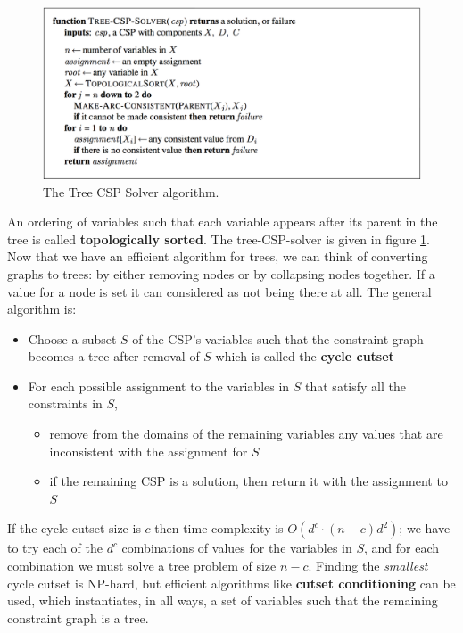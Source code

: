 \documentclass[twoside]{article}
\begin{document}
\begin{figure}
  \includegraphics[width=\linewidth]{tcs.png}
  \caption{The Tree CSP Solver algorithm.}
  \label{fig:tcs}
\end{figure}
An ordering of variables such that each variable appears after its parent in
the tree is called \textbf{topologically sorted}. The tree-CSP-solver is given
in figure \ref{fig:tcs}. Now that we have an efficient algorithm for trees, we 
can think of converting graphs to trees: by either removing nodes or by 
collapsing nodes together. If a value for a node is set it can considered as 
not being there at all. The general algorithm is:
\begin{itemize}
        \item Choose a subset \(S\) of the CSP's variables such that the 
        constraint graph becomes a tree after removal of \(S\) which is called
        the \textbf{cycle cutset}
        \item For each possible assignment to the variables in \(S\) that satisfy
        all the constraints in \(S\),
        \begin{itemize}
                \item remove from the domains of the remaining variables any
                values that are inconsistent with the assignment for \(S\)
                \item if the remaining CSP is a solution, then return it with 
                the assignment to \(S\)
        \end{itemize}
\end{itemize}
If the cycle cutset size is \(c\) then time complexity is \(O(d^c\cdot (n-c)d^2)\);
we have to try each of the \(d^c\) combinations of values for the variables in
\(S\), and for each combination we must solve a tree problem of size \(n-c\).
Finding the \emph{smallest} cycle cutset is NP-hard, but efficient algorithms 
like \textbf{cutset conditioning} can be used, which instantiates, in all ways,
a set of variables such that the remaining constraint graph is a tree.
\end{document}
